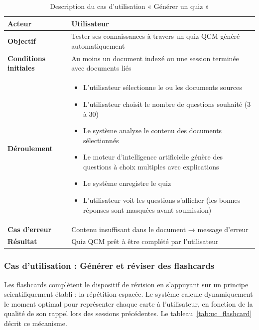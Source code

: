 \begin{table}[H]
\centering
\renewcommand{\arraystretch}{1.2}
\begin{tabular}{|p{4cm}|p{10cm}|}
\hline
\textbf{Acteur} & Utilisateur \\ \hline
\textbf{Objectif} & Tester ses connaissances à travers un quiz QCM généré
                    automatiquement \\ \hline
\textbf{Conditions initiales} & Au moins un document indexé ou une session
                                 terminée avec documents liés \\ \hline
\textbf{Déroulement} &
\begin{itemize}
    \item L'utilisateur sélectionne le ou les documents sources
    \item L'utilisateur choisit le nombre de questions souhaité (3 à 30)
    \item Le système analyse le contenu des documents sélectionnés
    \item Le moteur d'intelligence artificielle génère des questions à choix multiples avec explications
    \item Le système enregistre le quiz
    \item L'utilisateur voit les questions s'afficher (les bonnes réponses sont masquées avant soumission)
\end{itemize} \\ \hline
\textbf{Cas d'erreur} & Contenu insuffisant dans le document →
                        message d'erreur \\ \hline
\textbf{Résultat} & Quiz QCM prêt à être complété par l'utilisateur \\ \hline
\end{tabular}
\caption{Description du cas d'utilisation « Générer un quiz »}
\label{tab:uc_quiz}
\end{table}

\subsubsection{Cas d'utilisation : Générer et réviser des flashcards}

Les flashcards complètent le dispositif de révision en s'appuyant sur un principe scientifiquement établi : la répétition espacée. Le système calcule dynamiquement le moment optimal pour représenter chaque carte à l'utilisateur, en fonction de la qualité de son rappel lors des sessions précédentes. Le tableau~\ref{tab:uc_flashcard} décrit ce mécanisme.

